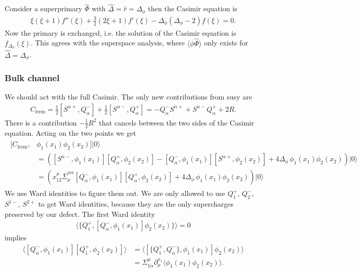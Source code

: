 \documentclass[letterpaper]{article}
\let\Oldsubsubsection\subsubsection
\renewcommand{\subsubsection}{\FloatBarrier\Oldsubsubsection}
\def\a{{\alpha}}
\def\ad{{\dot{\alpha}}}
\begin{document}
Consider a superprimary $\hat \Phi$ with $\hat \Delta = \hat r = \Delta_\phi$ then the Casimir equation is
\begin{align}
 \xi  (\xi +1) f''(\xi )+\frac{3}{2} (2 \xi +1) f'(\xi )
 - \Delta_\phi \left( \Delta_\phi - 2 \right) f(\xi ) = 0.
\end{align}
Now the primary is exchanged, i.e. the solution of the Casimir equation is $f_{\Delta_\phi}(\xi)$.
This agrees with the superspace analysis, where $\langle \phi \hat \Phi \rangle$ only exists for $\hat \Delta = \Delta_\phi$.

\subsubsection{Bulk channel}

We should act with the full Casimir.
The only new contributions from susy are
\begin{align}
 C_{\text{ferm}} =
 \frac{1}{2} [S^{\ad+}, Q^-_\ad] + 
 \frac{1}{2} [S^{\a-}, Q^+_\a] =
 -Q^-_\ad S^{\ad+} + S^{\ad-} Q^+_\a + 2R.
\end{align}
There is a contribution $-\frac12 R^2$ that cancels between the two sides of the Casimir equation.
Acting on the two points we get
\begin{align}
\begin{split}
 [C_{\text{ferm}}, & \phi_1(x_1) \phi_2(x_2) ] |0\rangle \\
 & =
 \left( 
    [S^{\a-},  \phi_1(x_1)] [Q^+_\a,   \phi_2(x_2)]
  - [Q^-_\ad,  \phi_1(x_1)] [S^{\ad+}, \phi_2(x_2)]
  + 4 \Delta_\phi \, \phi_1(x_1) \phi_2(x_2)
 \right) |0\rangle \\
 & = 
 \left(
    x_{12}^\mu \bar \Sigma_\mu^{\ad\a} [Q^-_\ad, \phi_1(x_1)] [Q^+_\a, \phi_2(x_2)]
  + 4 \Delta_\phi \, \phi_1(x_1) \phi_2(x_2)
 \right) |0\rangle
\end{split}
\end{align}
We use Ward identities to figure them out.
We are only allowed to use $Q^+_1$, $Q^-_2$, $S^{1-}$, $S^{2+}$ to get Ward identities, because they are the only supercharges preserved by our defect.
The first Ward identity
\begin{align}
 \langle \{ Q_1^+, [Q_\ad^-, \phi_1(x_1)] \phi_2(x_2) \} \rangle = 0
\end{align}
implies
\begin{align}
 \langle [Q_\ad^-, \phi_1(x_1)] [Q_1^+, \phi_2(x_2)] \rangle 
 & = \langle [ \{Q_1^+, Q_\ad^-\}, \phi_1(x_1)] \phi_2(x_2) \rangle \\
 & = \Sigma^\mu_{1\ad} \partial_\mu^{x_1} \langle \phi_1(x_1) \phi_2(x_2) \rangle. 
\end{align}
\end{document}
